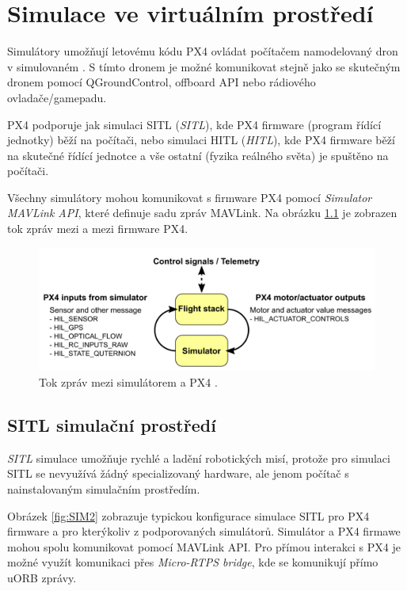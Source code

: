 \chapter{Simulace ve virtuálním prostředí}

Simulátory umožňují letovému kódu PX4 ovládat počítačem namodelovaný dron v simulovaném . S tímto dronem je možné komunikovat stejně jako se skutečným dronem pomocí QGroundControl, offboard API nebo rádiového ovladače/gamepadu. 

PX4 podporuje jak simulaci \acs{SITL} (\textit{\acl{SITL}}), kde PX4 firmware (program řídící jednotky) běží na počítači, nebo simulaci \acs{HITL} (\textit{\acl{HITL}}), kde PX4 firmware běží na skutečné řídící jednotce a vše ostatní (fyzika reálného světa) je spuštěno na počítači. \cite{PX4docs}

Všechny simulátory mohou komunikovat s firmware PX4 pomocí \textit{Simulator MAVLink API}, které definuje sadu zpráv MAVLink. Na obrázku \ref{fig:SIM1} je zobrazen tok zpráv mezi  a mezi firmware PX4.

\begin{figure}[!ht]
  \begin{center}
    \includegraphics[scale=0.3]{obrazky/SIM1}
  \end{center}
  \caption[Tok zpráv mezi simulátorem a PX4]{Tok zpráv mezi simulátorem a PX4 \cite{PX4docs}.}
  \label{fig:SIM1}
\end{figure}

\section{SITL simulační prostředí}

\textit{\acl{SITL}} simulace umožňuje rychlé a  ladění robotických misí, protože pro simulaci \acs{SITL} se nevyužívá žádný specializovaný hardware, ale jenom počítač s nainstalovaným simulačním prostředím.

Obrázek \ref{fig:SIM2} zobrazuje typickou konfigurace simulace \acs{SITL} pro PX4 firmware a pro kterýkoliv z podporovaných simulátorů. Simulátor a PX4 firmawe mohou spolu komunikovat pomocí MAVLink \acs{API}. Pro přímou interakci s PX4 je možné využít komunikaci přes \textit{Micro-RTPS bridge}, kde se komunikují přímo uORB zprávy.

